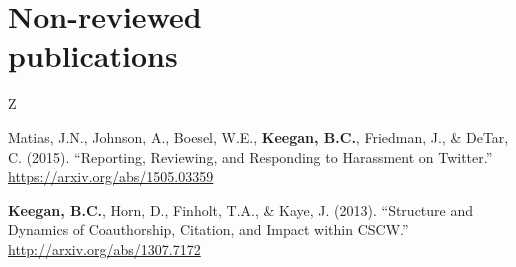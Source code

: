 \documentclass{cv}
\begin{document}
	\section{Non-reviewed\\publications}
	\begin{entries}{Z}
		\item Matias, J.N., Johnson, A., Boesel, W.E., \textbf{Keegan, B.C.}, Friedman, J., \& DeTar, C. (2015). ``Reporting, Reviewing, and Responding to Harassment on Twitter.'' \url{https://arxiv.org/abs/1505.03359}
		\item \textbf{Keegan, B.C.}, Horn, D., Finholt, T.A., \& Kaye, J. (2013). ``Structure and Dynamics of Coauthorship, Citation, and Impact within CSCW.'' \url{http://arxiv.org/abs/1307.7172}
	\end{entries}
\end{document}
